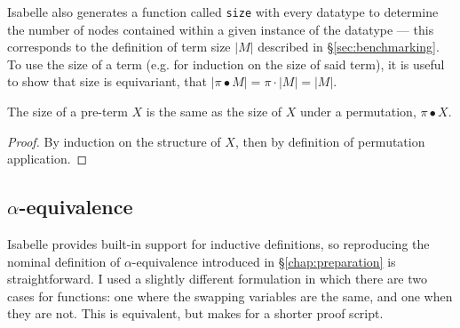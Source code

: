 Isabelle also generates a function called \texttt{size} with every datatype to determine the number of nodes contained within a given instance of the datatype --- this corresponds to the definition of term size \(|M|\) described in \S\ref{sec:benchmarking}.
To use the size of a term (e.g. for induction on the size of said term), it is useful to show that size is equivariant, that \(|\pi \bullet M| = \pi \cdot |M| = |M|\).

\begin{lemma}
The size of a pre-term \(X\) is the same as the size of \(X\) under a permutation, \(\pi \bullet X\).
\end{lemma}
\begin{proof}
By induction on the structure of \(X\), then by definition of permutation application.
\end{proof}

\subsection{\(\alpha\)-equivalence}
Isabelle provides built-in support for inductive definitions, so reproducing the nominal definition of \(\alpha\)-equivalence introduced in \S\ref{chap:preparation} is straightforward.
I used a slightly different formulation in which there are two cases for functions: one where the swapping variables are the same, and one when they are not.
This is equivalent, but makes for a shorter proof script.


